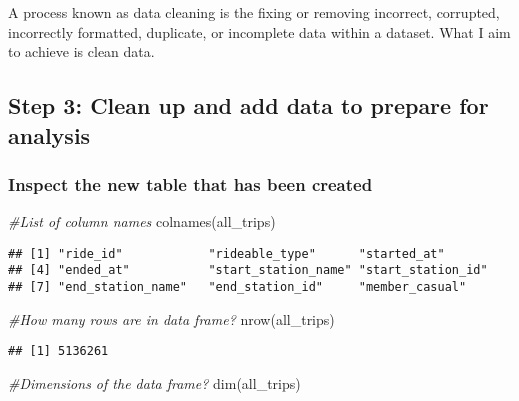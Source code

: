 \documentclass[
]{article}
\newenvironment{Shaded}{\begin{snugshade}}{\end{snugshade}}
\newcommand{\CommentTok}[1]{\textcolor[rgb]{0.56,0.35,0.01}{\textit{#1}}}
\newcommand{\FunctionTok}[1]{\textcolor[rgb]{0.00,0.00,0.00}{#1}}
\newcommand{\NormalTok}[1]{#1}
\begin{document}
A process known as data cleaning is the fixing or removing incorrect,
corrupted, incorrectly formatted, duplicate, or incomplete data within a
dataset. What I aim to achieve is clean data.

\hypertarget{step-3-clean-up-and-add-data-to-prepare-for-analysis}{%
\subsection{Step 3: Clean up and add data to prepare for
analysis}\label{step-3-clean-up-and-add-data-to-prepare-for-analysis}}

\hypertarget{inspect-the-new-table-that-has-been-created}{%
\subsubsection{Inspect the new table that has been
created}\label{inspect-the-new-table-that-has-been-created}}

\begin{Shaded}
\begin{Highlighting}[]
\CommentTok{\#List of column names}
\FunctionTok{colnames}\NormalTok{(all\_trips) }
\end{Highlighting}
\end{Shaded}

\begin{verbatim}
## [1] "ride_id"            "rideable_type"      "started_at"        
## [4] "ended_at"           "start_station_name" "start_station_id"  
## [7] "end_station_name"   "end_station_id"     "member_casual"
\end{verbatim}

\begin{Shaded}
\begin{Highlighting}[]
\CommentTok{\#How many rows are in data frame?}
\FunctionTok{nrow}\NormalTok{(all\_trips)  }
\end{Highlighting}
\end{Shaded}

\begin{verbatim}
## [1] 5136261
\end{verbatim}

\begin{Shaded}
\begin{Highlighting}[]
\CommentTok{\#Dimensions of the data frame?}
\FunctionTok{dim}\NormalTok{(all\_trips) }
\end{Highlighting}
\end{Shaded}
\end{document}
